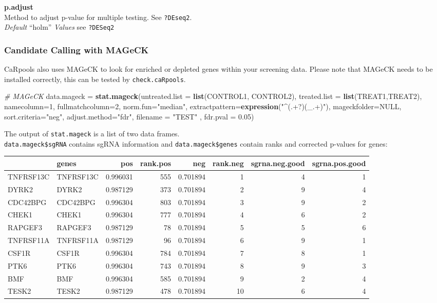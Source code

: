 \documentclass[]{article}
\newenvironment{Shaded}{\begin{snugshade}}{\end{snugshade}}
\newcommand{\KeywordTok}[1]{\textcolor[rgb]{0.13,0.29,0.53}{\textbf{{#1}}}}
\newcommand{\DataTypeTok}[1]{\textcolor[rgb]{0.13,0.29,0.53}{{#1}}}
\newcommand{\DecValTok}[1]{\textcolor[rgb]{0.00,0.00,0.81}{{#1}}}
\newcommand{\FloatTok}[1]{\textcolor[rgb]{0.00,0.00,0.81}{{#1}}}
\newcommand{\StringTok}[1]{\textcolor[rgb]{0.31,0.60,0.02}{{#1}}}
\newcommand{\CommentTok}[1]{\textcolor[rgb]{0.56,0.35,0.01}{\textit{{#1}}}}
\newcommand{\OtherTok}[1]{\textcolor[rgb]{0.56,0.35,0.01}{{#1}}}
\newcommand{\NormalTok}[1]{{#1}}
\begin{document}
\textbf{p.adjust}\\
Method to adjust p-value for multiple testing. See \texttt{?DEseq2}.\\
\emph{Default} ``holm'' \emph{Values} see \texttt{?DESeq2}

\subsubsection{Candidate Calling with
MAGeCK}\label{candidate-calling-with-mageck}

CaRpools also uses MAGeCK to look for enriched or depleted genes within
your screening data. Please note that MAGeCK needs to be installed
correctly, this can be tested by \texttt{check.caRpools}.

\begin{Shaded}
\begin{Highlighting}[]
\CommentTok{# MAGeCK}
\NormalTok{data.mageck =}\StringTok{ }\KeywordTok{stat.mageck}\NormalTok{(}\DataTypeTok{untreated.list =} \KeywordTok{list}\NormalTok{(CONTROL1, CONTROL2), }\DataTypeTok{treated.list =} \KeywordTok{list}\NormalTok{(TREAT1,TREAT2), }\DataTypeTok{namecolumn=}\DecValTok{1}\NormalTok{, }\DataTypeTok{fullmatchcolumn=}\DecValTok{2}\NormalTok{, }\DataTypeTok{norm.fun=}\StringTok{"median"}\NormalTok{, }\DataTypeTok{extractpattern=}\KeywordTok{expression}\NormalTok{(}\StringTok{"^(.+?)(_.+)"}\NormalTok{), }\DataTypeTok{mageckfolder=}\OtherTok{NULL}\NormalTok{, }\DataTypeTok{sort.criteria=}\StringTok{"neg"}\NormalTok{, }\DataTypeTok{adjust.method=}\StringTok{"fdr"}\NormalTok{, }\DataTypeTok{filename =} \StringTok{"TEST"} \NormalTok{, }\DataTypeTok{fdr.pval =} \FloatTok{0.05}\NormalTok{)}
\end{Highlighting}
\end{Shaded}

The output of \texttt{stat.mageck} is a list of two data frames.\\
\texttt{data.mageck\$sgRNA} contains sgRNA information and
\texttt{data.mageck\$genes} contain ranks and corrected p-values for
genes:

\begin{longtable}[c]{@{}llrrrrrr@{}}
\toprule
& genes & pos & rank.pos & neg & rank.neg & sgrna.neg.good &
sgrna.pos.good\tabularnewline
\midrule
\endhead
TNFRSF13C & TNFRSF13C & 0.996031 & 555 & 0.701894 & 1 & 4 &
1\tabularnewline
DYRK2 & DYRK2 & 0.987129 & 373 & 0.701894 & 2 & 9 & 4\tabularnewline
CDC42BPG & CDC42BPG & 0.996304 & 803 & 0.701894 & 3 & 9 &
2\tabularnewline
CHEK1 & CHEK1 & 0.996304 & 777 & 0.701894 & 4 & 6 & 2\tabularnewline
RAPGEF3 & RAPGEF3 & 0.987129 & 78 & 0.701894 & 5 & 5 & 6\tabularnewline
TNFRSF11A & TNFRSF11A & 0.987129 & 96 & 0.701894 & 6 & 9 &
1\tabularnewline
CSF1R & CSF1R & 0.996304 & 784 & 0.701894 & 7 & 8 & 1\tabularnewline
PTK6 & PTK6 & 0.996304 & 743 & 0.701894 & 8 & 9 & 3\tabularnewline
BMF & BMF & 0.996304 & 585 & 0.701894 & 9 & 2 & 4\tabularnewline
TESK2 & TESK2 & 0.987129 & 478 & 0.701894 & 10 & 6 & 4\tabularnewline
\bottomrule
\end{longtable}
\end{document}
